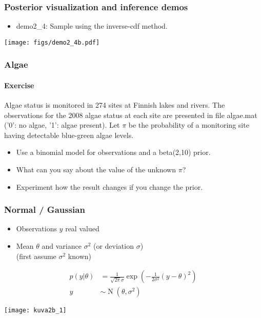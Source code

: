 \documentclass[english,t]{beamer}
\renewcommand{\emph}[1]{\textcolor{navyblue}{#1}}
\DeclareMathOperator{\N}{N}
\begin{document}
\begin{frame}
  \frametitle{Posterior visualization and inference demos}

  \begin{itemize}
  \item demo2\_4: Sample using the inverse-cdf method.
  \end{itemize}
  \texttt{[image: figs/demo2\_4b.pdf]}
\end{frame}

\begin{frame}
  \frametitle{Algae}
  \framesubtitle{Exercise}

Algae status is monitored in 274 sites at Finnish lakes and rivers. 
The observations for the 2008 algae status at each site are presented
in file \emph{algae.mat} ('0': no algae, '1': algae present). 
Let $\pi$ be the probability of a monitoring site having detectable
blue-green algae levels. 

\begin{itemize}
\item Use a binomial model for observations and a \emph{beta}(2,10) prior.
\item What can you say about the value of the unknown $\pi$?
\item Experiment how the result changes if you change the prior.
\end{itemize}

\end{frame}


\begin{frame}
  \frametitle{Normal / Gaussian}

  \begin{itemize}
  \item Observations $y$ real valued
  \item Mean $\theta$ and variance $\sigma^2$ (or deviation $\sigma$)\\
    (first assume $\sigma^2$ known)
  \end{itemize}
  \vskip -2mm
  \begin{align*}
    p(y|\theta)&=\frac{1}{\sqrt{2\pi}\sigma}\exp\left(-\frac{1}{2\sigma^2}(y-\theta)^2\right)\\
    y & \sim \N(\theta,\sigma^2)
  \end{align*}

  \begin{center}
      \texttt{[image: kuva2b\_1]}
  \end{center}
\end{frame}
\end{document}
